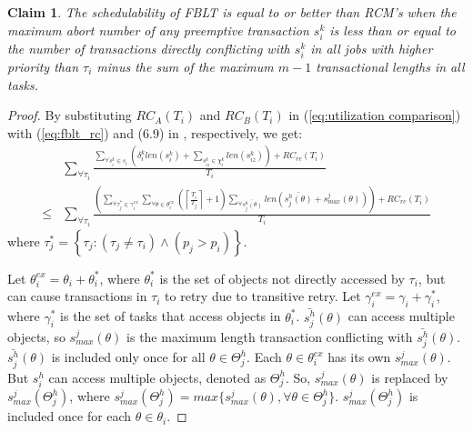 \documentclass[prodmode,acmtecs]{acmsmall}
\newtheorem{clm}{Claim}
\begin{document}
\begin{clm}\label{clm:fblt_rcm}
The schedulability of FBLT is equal to or better than RCM's when the maximum abort number
of any preemptive transaction $s_{i}^{k}$ is less than or equal to the number of transactions directly conflicting with $s_{i}^{k}$ in all jobs with higher priority than $\tau_{i}$ minus the sum of the maximum $m-1$ transactional lengths in all tasks.
\end{clm}
%
\begin{proof}
By substituting $RC_{A}(T_{i})$ and $RC_{B}(T_{i})$ in (\ref{eq:utilization comparison})
with (\ref{eq:fblt_rc}) and (6.9) in \cite{shambake_phd_proposal}, respectively, we get:
\begin{eqnarray}
 & \sum_{\forall\tau_{i}}\frac{\sum_{\forall s_{i}^{k}\in s_{i}}\left(\delta_i^klen(s_{i}^{k})+\sum_{s_{iz}^k\in \chi_i^k} len(s_{iz}^{k})\right)+RC_{re}(T_{i})}{T_{i}}\label{eq:fblt_rcm_comparison_1}\\
\le & \sum_{\forall\tau_{i}}\frac{\left(\sum_{\forall\tau_{j}^{*}\in\gamma_{i}^{ex}}\sum_{\forall\theta\in\theta_{i}^{ex}}\left(\left\lceil \frac{T_{i}}{T_{j}}\right\rceil +1\right)\sum_{\forall\bar{s_{j}^{h}(\theta)}}len\left(\bar{s_{j}^{h}(\theta)}+s_{max}^{j}(\theta)\right)\right)+RC_{re}(T_{i})}{T_{i}}\nonumber 
\end{eqnarray}
where $\tau_{j}^{*}=\left\{ \tau_{j}:\left(\tau_{j}\ne\tau_{i}\right)\wedge\left(p_{j}>p_{i}\right)\right\} $.


Let $\theta_{i}^{ex}=\theta_{i}+\theta_{i}^{*}$, where $\theta_{i}^{*}$
is the set of objects not directly accessed by $\tau_{i}$, 
but can cause transactions in $\tau_{i}$ to retry due to transitive retry.
%
Let $\gamma_{i}^{ex}=\gamma_{i}+\gamma_{i}^{*}$, where $\gamma_{i}^{*}$
is the set of tasks that access objects in $\theta_{i}^{*}$. $\bar{s_{j}^{h}}(\theta)$
can access multiple objects, so $s_{max}^{j}(\theta)$ is the maximum
length transaction conflicting with $\bar{s_{j}^{h}}(\theta)$. $\bar{s_{j}^{h}}(\theta)$ is included only once for all $\theta \in \Theta_j^h$. Each $\theta \in \theta_i^{ex}$ has its own $s_{max}^j(\theta)$. But $s_i^h$ can access multiple objects, denoted as $\Theta_j^h$. So, $s_{max}^j(\theta)$ is replaced by $s_{max}^j(\Theta_j^h)$, where $s_{max}^j(\Theta_j^h)=max\{s_{max}^j(\theta),\forall \theta \in \Theta_j^h\}$. $s_{max}^j(\Theta_j^h)$ is included once for each $\theta \in \theta_i$. 



\end{proof}
\end{document}
